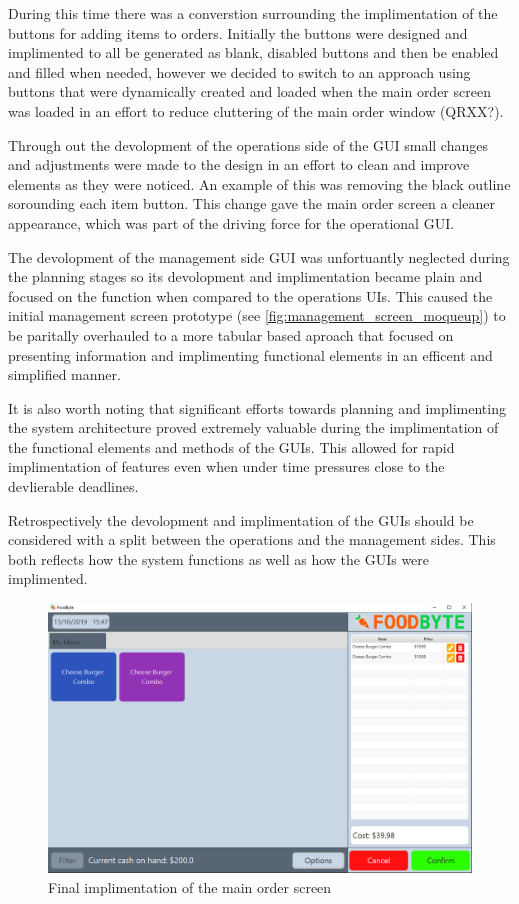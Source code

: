 During this time there was a converstion surrounding the implimentation of the buttons for adding items to orders. Initially the buttons were designed and implimented to all be generated as blank, disabled buttons and then be enabled and filled when needed, however we decided to switch to an approach using buttons that were dynamically created and loaded when the main order screen was loaded in an effort to reduce cluttering of the main order window (QRXX?).

Through out the devolopment of the operations side of the GUI small changes and adjustments were made to the design in an effort to clean and improve elements as they were noticed. An example of this was removing the black outline sorounding each item button. This change gave the main order screen a cleaner appearance, which was part of the driving force for the operational GUI.

The devolopment of the management side GUI was unfortuantly neglected during the planning stages so its devolopment and implimentation became plain and focused on the function when compared to the operations UIs. This caused the initial management screen prototype (see \ref{fig:management_screen_moqueup}) to be paritally overhauled to a more tabular based aproach that focused on presenting information and implimenting functional elements in an efficent and simplified manner.

It is also worth noting that significant efforts towards planning and implimenting the system architecture proved extremely valuable during the implimentation of the functional elements and methods of the GUIs. This allowed for rapid implimentation of features even when under time pressures close to the devlierable deadlines.

Retrospectively the devolopment and implimentation of the GUIs should be considered with a split between the operations and the management sides. This both reflects how the system functions as well as how the GUIs were implimented. 

\begin{figure}[ht]
	\centering
	\includegraphics[width=150mm]{images/Final_GUI/main_order_screen.png}
	\caption{Final implimentation of the main order screen}
	\label{fig:final_order_screen}
\end{figure}

